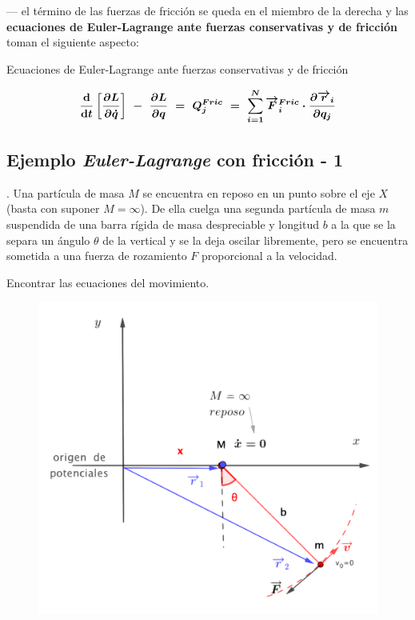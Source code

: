 --- el término de las fuerzas de fricción se queda en el miembro de la derecha y las \textbf{ecuaciones de Euler-Lagrange ante fuerzas conservativas y de  fricción} toman el siguiente aspecto:

\vspace{0.5cm}

\begin{large}
\begin{myblock}{\begin{normalsize}Ecuaciones de Euler-Lagrange ante fuerzas conservativas y de  fricción\end{normalsize}}
\begin{equation}
\label{T4EEF1}
\boldsymbol{ \
\dv{t} \left[ \pdv{ L }{\dot q} \right] \ - \ \pdv{L}{q} \ = \ Q_j^{Fric} \ = \ \sum_{i=1}^N \overrightarrow F_i^{Fric} \cdot \pdv{\overrightarrow r_i}{q_j}	
\ } 
\end{equation}	
\end{myblock}
\end{large}

\vspace{1cm}
\subsection{Ejemplo \emph{Euler-Lagrange} con fricción - 1}
\label{T4SecELF}
\vspace{0.5cm}


\begin{example}
.	Una partícula de masa $M$ se encuentra en reposo en un punto sobre el eje $X$ (basta con suponer $M=\infty$). De ella cuelga una segunda partícula de masa $m$ suspendida de una barra rígida de masa despreciable y longitud $b$ a la que se la separa un ángulo $\theta$ de la vertical y se la deja oscilar libremente, pero se encuentra sometida a una fuerza de rozamiento $F$ proporcional a la velocidad. 	
	
	\vspace{2mm} Encontrar las ecuaciones del movimiento.

	\begin{figure}[H]
		\centering
		\includegraphics[width=.5\textwidth]{imagenes/img04-01.png}
		\end{figure}	
\end{example}

